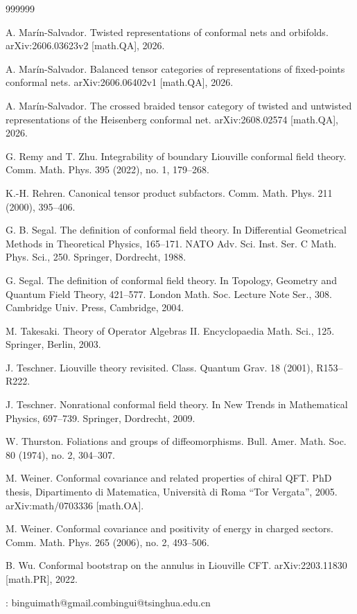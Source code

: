 \documentclass[11pt,b5paper,notitlepage]{article}
\theoremstyle{definition}
\theoremstyle{plain}
\numberwithin{equation}{section}
\begin{document}
\begin{thebibliography}{999999}

A. Mar\'in-Salvador. Twisted representations of conformal nets and orbifolds. arXiv:2606.03623v2 [math.QA], 2026.

A. Mar\'in-Salvador. Balanced tensor categories of representations of fixed-points conformal nets. arXiv:2606.06402v1 [math.QA], 2026.


A. Mar\'in-Salvador. The crossed braided tensor category of twisted and untwisted representations of the Heisenberg conformal net. arXiv:2608.02574 [math.QA], 2026.


G. Remy and T. Zhu.
Integrability of boundary Liouville conformal field theory.
Comm. Math. Phys. 395 (2022), no. 1, 179--268.

K.-H. Rehren.
Canonical tensor product subfactors.
Comm. Math. Phys. 211 (2000), 395--406.

G. B. Segal.
The definition of conformal field theory.
In Differential Geometrical Methods in Theoretical Physics, 165--171.
NATO Adv. Sci. Inst. Ser. C Math. Phys. Sci., 250.
Springer, Dordrecht, 1988.


G. Segal.
The definition of conformal field theory.
In Topology, Geometry and Quantum Field Theory, 421--577.
London Math. Soc. Lecture Note Ser., 308.
Cambridge Univ. Press, Cambridge, 2004.



M. Takesaki. Theory of Operator Algebras II. Encyclopaedia Math. Sci., 125. Springer, Berlin, 2003.

J. Teschner.
Liouville theory revisited.
Class. Quantum Grav. 18 (2001), R153--R222.


J. Teschner.
Nonrational conformal field theory.
In New Trends in Mathematical Physics, 697--739.
Springer, Dordrecht, 2009.



W. Thurston.
Foliations and groups of diffeomorphisms.
Bull. Amer. Math. Soc. 80 (1974), no. 2, 304--307.


M. Weiner. Conformal covariance and related properties of chiral QFT. PhD thesis, Dipartimento di Matematica, Universit\`a di Roma ``Tor Vergata'', 2005. arXiv:math/0703336 [math.OA].

M. Weiner. Conformal covariance and positivity of energy in charged sectors.
Comm. Math. Phys. 265 (2006), no. 2, 493--506.

B. Wu.
Conformal bootstrap on the annulus in Liouville CFT.
arXiv:2203.11830 [math.PR], 2022.




		
\end{thebibliography}


: binguimath@gmail.com\qquad bingui@tsinghua.edu.cn
\end{document}
